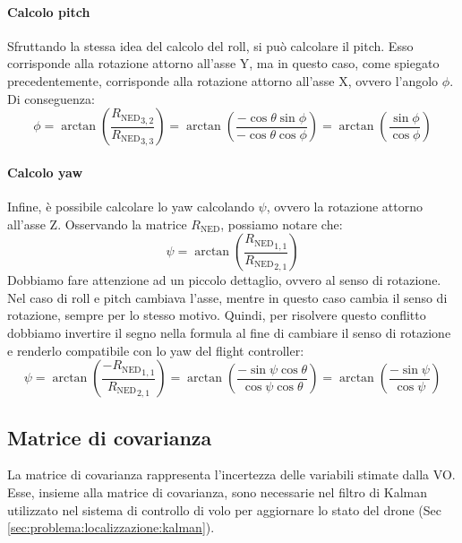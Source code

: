 \paragraph{Calcolo pitch} Sfruttando la stessa idea del calcolo del roll, si può calcolare il pitch. Esso corrisponde alla rotazione attorno all'asse Y, ma in questo caso, come spiegato precedentemente, corrisponde alla rotazione attorno all'asse X, ovvero l'angolo $\phi$. Di conseguenza:
\[
\boxed{
	\phi = \arctan(\frac{{R_\mathrm{NED}}_{3,2}}{{R_\mathrm{NED}}_{3,3}}) = \arctan(\frac{-\cos\theta\sin\phi}{-\cos\theta\cos\phi}) = \arctan(\frac{\sin\phi}{\cos\phi})
}
\]

\paragraph{Calcolo yaw} Infine, è possibile calcolare lo yaw calcolando $\psi$, ovvero la rotazione attorno all'asse Z. Osservando la matrice $R_\mathrm{NED}$, possiamo notare che:
\[
\psi=\arctan(\frac{{R_\mathrm{NED}}_{1,1}}{{R_\mathrm{NED}}_{2,1}})
\]
Dobbiamo fare attenzione ad un piccolo dettaglio, ovvero al senso di rotazione. Nel caso di roll e pitch cambiava l'asse, mentre in questo caso cambia il senso di rotazione, sempre per lo stesso motivo. Quindi, per risolvere questo conflitto dobbiamo invertire il segno nella formula al fine di cambiare il senso di rotazione e renderlo compatibile con lo yaw del flight controller:
\[
\boxed{
	\psi=\arctan(\frac{-{R_\mathrm{NED}}_{1,1}}{{R_\mathrm{NED}}_{2,1}})=\arctan(\frac{-\sin\psi\cos\theta}{\cos\psi\cos\theta})=\arctan(\frac{-\sin\psi}{\cos\psi})
}
\]

\subsection{Matrice di covarianza}
\label{sez:archi:vo:covarianza}
La matrice di covarianza rappresenta l'incertezza delle variabili stimate dalla VO. Esse, insieme alla matrice di covarianza, sono necessarie nel filtro di Kalman utilizzato nel sistema di controllo di volo per aggiornare lo stato del drone (Sec \ref{sec:problema:localizzazione:kalman}).

